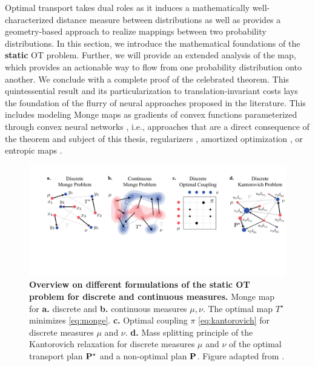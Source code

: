  Optimal transport takes dual roles as it induces a mathematically well-characterized distance measure between distributions as well as provides a geometry-based approach to realize mappings between two probability distributions.
In this section, we introduce the mathematical foundations of the \textbf{static} OT problem. Further, we will provide an extended analysis of the \citeauthor{monge1781histoire} map, which provides an actionable way to flow from one probability distribution onto another.
We conclude with a complete proof of the celebrated \citeauthor{brenier1987decomposition} theorem. This quintessential result and its particularization to translation-invariant costs lays the foundation of the flurry of neural approaches proposed in the literature. This includes modeling Monge maps as gradients of convex functions parameterized through convex neural networks \citep{amos2017input, huang2021convex, makkuva2020optimal, korotin2021neural, lubeck2022neural, bunne2022supervised}, i.e., approaches that are a direct consequence of the \citeauthor{brenier1987decomposition} theorem and subject of this thesis, regularizers \citep{uscidda2023monge}, amortized optimization \citep{amos2023amortizing, amos2023meta}, or entropic maps \citep{pooladian2021entropic, pooladian2023minimax, divol2022optimal, cuturi2023monge}.

\begin{figure}[t]
  \includegraphics[width=\textwidth]{figures/fig_ot_background.pdf}
  \caption{\textbf{Overview on different formulations of the static OT problem for discrete and continuous measures.} Monge map for \textbf{a.} discrete and \textbf{b.} continuous measures $\mu, \nu$. The optimal map $T^\star$ minimizes \eqref{eq:monge}. \textbf{c.} Optimal coupling $\pi$ \eqref{eq:kantorovich} for discrete measures $\mu$ and $\nu$. \textbf{d.} Mass splitting principle of the Kantorovich relaxation for discrete measures $\mu$ and $\nu$ of the optimal transport plan $\mathbf{P}^\star$ and a non-optimal plan $\mathbf{P}$. Figure adapted from \citet{peyre2019computational}.}	
  \label{fig:ot_principles}
\end{figure}

